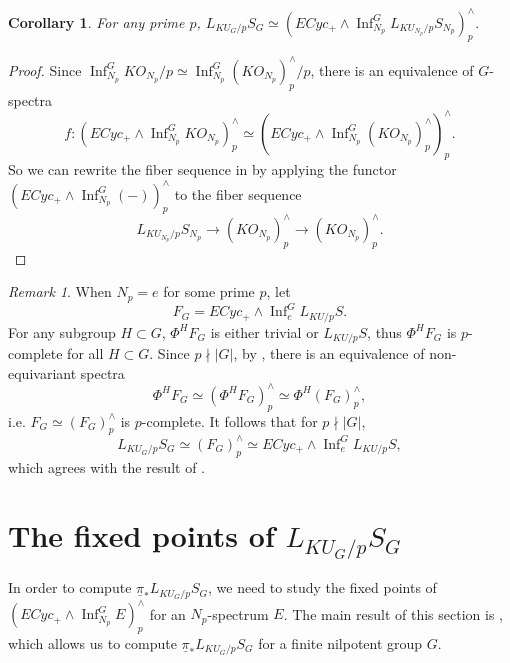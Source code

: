 \documentclass{amsart}
\theoremstyle{plain}
\newtheorem{corollary}[theorem]{Corollary}
\theoremstyle{definition}
\theoremstyle{remark}
\newtheorem{remark}[theorem]{Remark}
\begin{document}
\begin{corollary}\label{cor:from Np equivariant to G equivariant}
    For any prime $p$,   
    $ L_{KU_G/p}S_G\simeq (ECyc_+\wedge \operatorname{Inf}_{N_p}^G L_{KU_{N_p}/p}S_{N_p})_p^\wedge. $
\end{corollary}
\begin{proof}
    Since $\operatorname{Inf}_{N_p}^G KO_{N_p}/p\simeq \operatorname{Inf}_{N_p}^G (KO_{N_p})_p^\wedge/p$, there is an equivalence of $G$-spectra 
    \[ 
    f:(ECyc_+\wedge \operatorname{Inf}_{N_p}^G KO_{N_p})_p^\wedge \simeq (ECyc_+\wedge \operatorname{Inf}_{N_p}^G (KO_{N_p})_p^\wedge)_p^\wedge.
    \]
    So we can rewrite the fiber sequence in  by applying the functor
    $(ECyc_+\wedge \operatorname{Inf}_{N_p}^G(-))_p^\wedge$
    to the fiber sequence
    \[
    L_{KU_{N_p}/p}S_{N_p}\to (KO_{N_p})_p^\wedge \to (KO_{N_p})_p^\wedge .
    \]
\end{proof}
\begin{remark}
    When $N_p=e$ for some prime $p$, let 
    \[
    F_G=ECyc_+\wedge \operatorname{Inf}_{e}^G L_{KU/p}S.
    \]
    For any subgroup $H\subset G$, $\Phi^H F_G$ is either trivial or $L_{KU/p}S$, thus $\Phi^H F_G$ is $p$-complete for all $H\subset G$. Since $p\nmid |G|$, by , there is an equivalence of non-equivariant spectra
    \[
    \Phi^H F_G\simeq (\Phi^H F_G)_p^\wedge \simeq \Phi^H (F_G)_p^\wedge,
    \] 
    i.e. $F_G\simeq (F_G)_p^\wedge$ is $p$-complete. 
    It follows that for $p\nmid |G|$,
    \[
    L_{KU_G/p}S_G\simeq (F_G)_p^\wedge\simeq ECyc_+\wedge \operatorname{Inf}_{e}^G L_{KU/p}S,
    \]
    which agrees with the result of \cite[Proposition 8.5]{bonventre2022ku_g}.
\end{remark}




\section{The fixed points of $L_{KU_G/p }S_G$}\label{Sec:fixed point of KU/p local sphere}
In order to compute $\underline{\pi}_* L_{KU_G/p }S_G$, we need to study the fixed points of $(ECyc_+\wedge \operatorname{Inf}_{N_p}^G E)_p^\wedge$ for an $N_p$-spectrum $E$. The main result of this section is , which allows us to compute $\underline{\pi}_* L_{KU_G/p}S_G$ for a finite nilpotent group $G$. 
\end{document}
